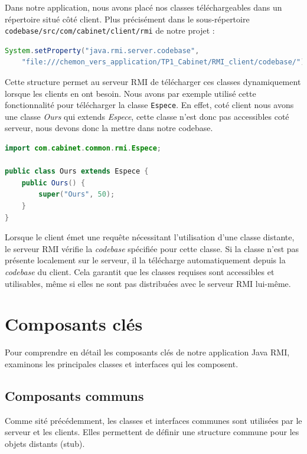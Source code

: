 \documentclass{article} %
\begin{document}
Dans notre application, nous avons placé nos classes téléchargeables dans un répertoire situé côté client.
Plus précisément dans le sous-répertoire 
\newline\texttt{codebase/src/com/cabinet/client/rmi} de notre projet : 

\begin{lstlisting}[language=java]
    System.setProperty("java.rmi.server.codebase",
	"file:///chemon_vers_application/TP1_Cabinet/RMI_client/codebase/");
\end{lstlisting}

Cette structure permet au serveur RMI de télécharger ces classes dynamiquement lorsque les clients en ont besoin.
Nous avons par exemple utilisé cette fonctionnalité pour télécharger la classe \texttt{Espece}.
En effet, coté client nous avons une classe \textit{Ours} qui extends \textit{Espece}, 
cette classe n'est donc pas accessibles coté serveur, nous devons donc la mettre dans notre codebase.

\begin{lstlisting}[language=Java]
import com.cabinet.common.rmi.Espece;

public class Ours extends Espece {
    public Ours() {
        super("Ours", 50);
    }
}
\end{lstlisting}

Lorsque le client émet une requête nécessitant l'utilisation d'une classe distante, 
le serveur RMI vérifie la \textit{codebase} spécifiée pour cette classe. 
Si la classe n'est pas présente localement sur le serveur, 
il la télécharge automatiquement depuis la \textit{codebase} du client. 
Cela garantit que les classes requises sont accessibles et utilisables, 
même si elles ne sont pas distribuées avec le serveur RMI lui-même.      

\newpage
\section{Composants clés}\label{sec:composants}

Pour comprendre en détail les composants clés de notre application Java RMI, 
examinons les principales classes et interfaces qui les composent.

\subsection{Composants communs}

Comme sité précédemment, les classes et interfaces communes sont utilisées par le serveur et les clients.
Elles permettent de définir une structure commune pour les objets distants (stub).
\end{document}
